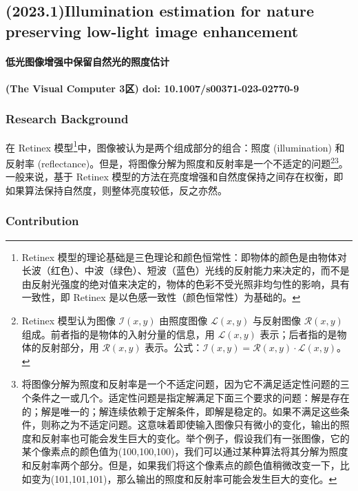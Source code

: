 \documentclass[letterpaper,10pt]{article}
\begin{document}
		\subsection{(2023.1)Illumination estimation for nature preserving low-light image enhancement}
		
		\paragraph{低光图像增强中保留自然光的照度估计}
		
		\paragraph{(The Visual Computer 3区) doi: 10.1007/s00371-023-02770-9}
		
			\subsubsection{Research Background}
			
			在 Retinex 模型\footnote{Retinex 模型的理论基础是三色理论和颜色恒常性：即物体的颜色是由物体对长波（红色）、中波（绿色）、短波（蓝色）光线的反射能力来决定的，而不是由反射光强度的绝对值来决定的，物体的色彩不受光照非均匀性的影响，具有一致性，即 Retinex 是以色感一致性（颜色恒常性）为基础的。}中，图像被认为是两个组成部分的组合：照度 (illumination) 和反射率 (reflectance)。但是，将图像分解为照度和反射率是一个不适定的问题\footnote{Retinex 模型认为图像 $\mathcal{I}(x,y)$ 由照度图像 $\mathcal{L}(x,y)$ 与反射图像 $\mathcal{R}(x,y)$ 组成。前者指的是物体的入射分量的信息，用 $\mathcal{L}(x,y)$ 表示；后者指的是物体的反射部分，用 $\mathcal{R}(x,y)$ 表示。公式：$\mathcal{I}(x,y)=\mathcal{R}(x,y) \cdot \mathcal{L}(x,y)$。}\footnote{将图像分解为照度和反射率是一个不适定问题，因为它不满足适定性问题的三个条件之一或几个。适定性问题是指定解满足下面三个要求的问题：解是存在的；解是唯一的；解连续依赖于定解条件，即解是稳定的。如果不满足这些条件，则称之为不适定问题。这意味着即使输入图像只有微小的变化，输出的照度和反射率也可能会发生巨大的变化。举个例子，假设我们有一张图像，它的某个像素点的颜色值为(100,100,100)，我们可以通过某种算法将其分解为照度和反射率两个部分。但是，如果我们将这个像素点的颜色值稍微改变一下，比如变为(101,101,101)，那么输出的照度和反射率可能会发生巨大的变化。}。一般来说，基于 Retinex 模型的方法在亮度增强和自然度保持之间存在权衡，即如果算法保持自然度，则整体亮度较低，反之亦然。
		
			\subsubsection{Contribution}
			
\end{document}
